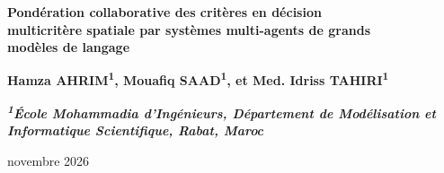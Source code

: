 \documentclass[11pt,a4paper]{article}
\begin{document}
\thispagestyle{plain}
\begin{center}
  \vspace*{1.2cm}
  {\LARGE\bfseries Pondération collaborative des critères en décision\\[2pt]
  multicritère spatiale par systèmes multi-agents de grands\\[2pt]
  modèles de langage\par}
  \vspace{0.6cm}
  {\large\bfseries Hamza AHRIM\textsuperscript{1}, Mouafiq SAAD\textsuperscript{1}, et Med. Idriss TAHIRI\textsuperscript{1}\par}
  \vspace{0.2cm}
  {\small\bfseries\itshape \textsuperscript{1}École Mohammadia d'Ingénieurs, Département de Modélisation et Informatique Scientifique, Rabat, Maroc\par}
  \vspace{0.8cm}
  novembre 2026
\end{center}
\end{document}
